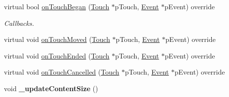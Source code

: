 \begin{DoxyCompactItemize}
\item 
virtual bool \hyperlink{classTableView_a195a00658f0ba79be1b59935569c3c7c}{on\+Touch\+Began} (\hyperlink{classTouch}{Touch} $\ast$p\+Touch, \hyperlink{classEvent}{Event} $\ast$p\+Event) override
\begin{DoxyCompactList}\small\item\em Callbacks. \end{DoxyCompactList}\item 
virtual void \hyperlink{classTableView_a242e9d8c695681b41eef636471e768b5}{on\+Touch\+Moved} (\hyperlink{classTouch}{Touch} $\ast$p\+Touch, \hyperlink{classEvent}{Event} $\ast$p\+Event) override
\item 
virtual void \hyperlink{classTableView_a361d91c5c592b3d81ed43b6743487fc3}{on\+Touch\+Ended} (\hyperlink{classTouch}{Touch} $\ast$p\+Touch, \hyperlink{classEvent}{Event} $\ast$p\+Event) override
\item 
virtual void \hyperlink{classTableView_a743113e92ef98837c4cfdacf40fd0a0f}{on\+Touch\+Cancelled} (\hyperlink{classTouch}{Touch} $\ast$p\+Touch, \hyperlink{classEvent}{Event} $\ast$p\+Event) override
\item 
\mbox{\label{classTableView_a7a77e69d84a47f298dbc3ce078c89db7}} 
void {\bfseries \+\_\+update\+Content\+Size} ()
\end{DoxyCompactItemize}
